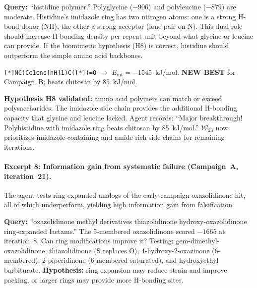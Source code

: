 \documentclass[twocolumn]{fairmeta}
\begin{document}
\begin{agentthought}
\scriptsize
\textbf{Query:} ``histidine polymer.''
Polyglycine ($-906$) and polyleucine ($-879$) are moderate.
Histidine's imidazole ring has two nitrogen atoms: one is a strong H-bond donor (NH), the other a strong acceptor (lone pair on N).
This dual role should increase H-bonding density per repeat unit beyond what glycine or leucine can provide.
If the biomimetic hypothesis (H8) is correct, histidine should outperform the simple amino acid backbones.
\end{agentthought}

\begin{toolcall}
\scriptsize
\texttt{[*]NC(Cc1cnc[nH]1)C([*])=O} $\to$ $E_\text{int} = -1545$~kJ/mol.
\textbf{NEW BEST} for Campaign~B; beats chitosan by 85~kJ/mol.
\end{toolcall}

\begin{observation}
\scriptsize
\textbf{Hypothesis H8 validated:} amino acid polymers can match or exceed polysaccharides.
The imidazole side chain provides the additional H-bonding capacity that glycine and leucine lacked.
Agent records: ``Major breakthrough! Polyhistidine with imidazole ring beats chitosan by 85~kJ/mol.''
$\mathcal{W}_{23}$ now prioritizes imidazole-containing and amide-rich side chains for remaining iterations.
\end{observation}

\paragraph{Excerpt 8: Information gain from systematic failure (Campaign~A, iteration~21).}
The agent tests ring-expanded analogs of the early-campaign oxazolidinone hit, all of which underperform, yielding high information gain from falsification.

\begin{agentthought}
\scriptsize
\textbf{Query:} ``oxazolidinone methyl derivatives thiazolidinone hydroxy-oxazolidinone ring-expanded lactams.''
The 5-membered oxazolidinone scored $-1665$ at iteration~8.
Can ring modifications improve it?
Testing: gem-dimethyl-oxazolidinone, thiazolidinone (S replaces O), 4-hydroxy-2-oxazinone (6-membered), 2-piperidinone (6-membered saturated), and hydroxyethyl barbiturate.
\textbf{Hypothesis:} ring expansion may reduce strain and improve packing, or larger rings may provide more H-bonding sites.
\end{agentthought}
\end{document}
